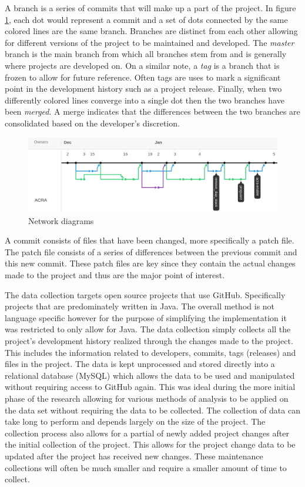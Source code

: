 A branch is a series of commits that will make up a part of the project. In figure \ref{fig:network_diagram}, each dot would represent a commit and a set of dots connected by the same colored lines are the same branch. Branches are distinct from each other allowing for different versions of the project to be maintained and developed. The \textit{master} branch is the main branch from which all branches stem from and is generally where projects are developed on. On a similar note, a \textit{tag} is a branch that is frozen to allow for future reference. Often tags are uses to mark a significant point in the development history such as a project release. Finally, when two differently colored lines converge into a single dot then the two branches have been \textit{merged}. A merge indicates that the differences between the two branches are consolidated based on the developer's discretion.

\begin{figure}[!ht]
    \centering
        \includegraphics[width=1.0\textwidth]{images/network}
    \caption{Network diagrams}
    \label{fig:network_diagram}
\end{figure}

A commit consists of files that have been changed, more specifically a patch file. The patch file consists of a series of differences between the previous commit and this new commit. These patch files are key since they contain the actual changes made to the project and thus are the major point of interest.

The data collection targets open source projects that use GitHub. Specifically projects that are predominately written in Java. The overall method is not language specific however for the purpose of simplifying the implementation it was restricted to only allow for Java. The data collection simply collects all the project's development history realized through the changes made to the project. This includes the information related to developers, commits, tags (releases) and files in the project. The data is kept unprocessed and stored directly into a relational database (MySQL) which allows the data to be used and manipulated without requiring access to GitHub again. This was ideal during the more initial phase of the research allowing for various methods of analysis to be applied on the data set without requiring the data to be collected. The collection of data can take long to perform and depends largely on the size of the project. The collection process also allows for a partial of newly added project changes after the initial collection of the project. This allows for the project change data to be updated after the project has received new changes. These maintenance collections will often be much smaller and require a smaller amount of time to collect.

